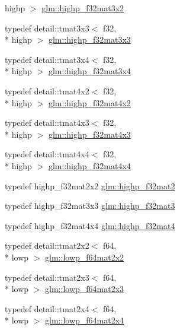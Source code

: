 \begin{DoxyCompactItemize}
highp $>$ \hyperlink{group__gtc__type__precision_gaf36b2b34ea881977c61491b0d3b25a28}{glm\-::highp\-\_\-f32mat3x2}
\item 
typedef detail\-::tmat3x3$<$ f32, \\*
highp $>$ \hyperlink{group__gtc__type__precision_ga334eca23d23aef90972fb20c5b749ca3}{glm\-::highp\-\_\-f32mat3x3}
\item 
typedef detail\-::tmat3x4$<$ f32, \\*
highp $>$ \hyperlink{group__gtc__type__precision_gaa71f504ecb02f9178026b01013b77ba0}{glm\-::highp\-\_\-f32mat3x4}
\item 
typedef detail\-::tmat4x2$<$ f32, \\*
highp $>$ \hyperlink{group__gtc__type__precision_ga4d799497b303c2434fe709f81f6bd4dd}{glm\-::highp\-\_\-f32mat4x2}
\item 
typedef detail\-::tmat4x3$<$ f32, \\*
highp $>$ \hyperlink{group__gtc__type__precision_ga5bd692575886422f501a379386e391d9}{glm\-::highp\-\_\-f32mat4x3}
\item 
typedef detail\-::tmat4x4$<$ f32, \\*
highp $>$ \hyperlink{group__gtc__type__precision_gafe24f12e4f5453058caea3f583ad7d9c}{glm\-::highp\-\_\-f32mat4x4}
\item 
typedef highp\-\_\-f32mat2x2 \hyperlink{group__gtc__type__precision_gaed934f561aaf8ad891c0a8f5e719aea8}{glm\-::highp\-\_\-f32mat2}
\item 
typedef highp\-\_\-f32mat3x3 \hyperlink{group__gtc__type__precision_ga06809818db73785334f839742a9ad85a}{glm\-::highp\-\_\-f32mat3}
\item 
typedef highp\-\_\-f32mat4x4 \hyperlink{group__gtc__type__precision_gac14c1bfb647e39d459c7489ede2156cc}{glm\-::highp\-\_\-f32mat4}
\item 
typedef detail\-::tmat2x2$<$ f64, \\*
lowp $>$ \hyperlink{group__gtc__type__precision_ga38e41c5332b4eb20b23b4ed1f06608d4}{glm\-::lowp\-\_\-f64mat2x2}
\item 
typedef detail\-::tmat2x3$<$ f64, \\*
lowp $>$ \hyperlink{group__gtc__type__precision_ga2add7d48faba102f53fbad2e14dfed12}{glm\-::lowp\-\_\-f64mat2x3}
\item 
typedef detail\-::tmat2x4$<$ f64, \\*
lowp $>$ \hyperlink{group__gtc__type__precision_ga38366c50f2a2755c49110c7fc1441683}{glm\-::lowp\-\_\-f64mat2x4}
\item 

\end{DoxyCompactItemize}
